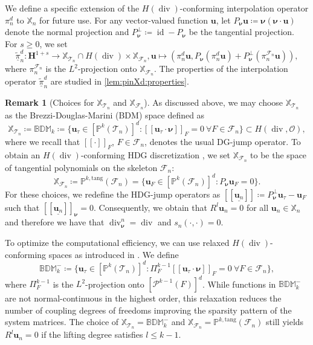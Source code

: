 \documentclass{m2an}
\newcommand{\dom}{\mathcal{O}} %
\newcommand{\nv}{\boldsymbol{\nu}}
\renewcommand{\u}{\mathbf{u}}
\renewcommand{\div}{\operatorname{div}}
\DeclareMathOperator{\Id}{\mathrm{id}}%
\newcommand{\calT}{\mathcal{T}}
\newcommand{\X}{\mathbb{X}}
\newcommand{\Xn}{\mathbb{X}_n}
\newcommand{\XT}{\X_{\mathcal{T}_n}}
\newcommand{\XF}{\X_{\mathcal{F}_n}}
\newcommand{\bH}{{\mathbf H}}
\newcommand{\jump}[1]{[\![ #1 ]\!]}
\newcommand{\hdgjump}[1]{[\![\underline{#1} ]\!]}
\newcommand{\Tn}{\calT_n}
\newcommand{\ddiv}{\div_{\nv}^n}
\newcommand{\Fn}{\mathcal{F}_n}
\newcommand{\pinXd}{\underline{\tilde{\pi}}_n^d}
\theoremstyle{plain}
\theoremstyle{definition}
\newtheorem{remark}[theorem]{Remark}
\begin{document}
We define a specific extension of the $H(\div)$-conforming interpolation operator $\pi_n^d$ to $\Xn$ for future use. For any vector-valued function $\u$, let $P_{\nv} \u \coloneqq \nv (\nv \cdot \u)$ denote the normal projection and $P_{\nv}^{\perp} \coloneqq \Id - P_{\nv}$ be the tangential projection. For $s \ge 0$, we set
\begin{equation}\label{eq:def:pinXd}
   \pinXd : \bH^{1+s} \to \XT \cap H(\div) \times \XF, \u \mapsto (\pi_n^d \u, P_{\nv}(\pi_n^d \u) + P_{\nv}^{\perp}(\pi_n^{\Fn}\u)),
\end{equation}
where $\pi_n^{\Fn}$ is the $L^2$-projection onto $\XF$. The properties of the interpolation operator $\pinXd$ are studied in \cref{lem:pinXd:properties}. 



\begin{remark}[Choices for $\XT$ and $\XF$]\label{rem:HdivHDG}
   As discussed above, we may choose $\XT$ as the Brezzi-Douglas-Marini (BDM) space \cite{BDM87} defined as 
   \begin{equation*}
      \XT \coloneqq \mathbb{BDM}_{k} \coloneqq \{ \u_{\tau} \in [\mathbb{P}^k(\Tn)]^d : \jump{\u_{\tau} \cdot \nv}_{F} = 0 \ \forall F \in \Fn \} \subset H(\div, \dom),
   \end{equation*}
   where we recall that $\jump{\cdot}_{F}$, $F \in \Fn$, denotes the usual DG-jump operator. To obtain an $H(\div)$-conforming HDG discretization \cite{LS16}, we set $\XF$ to be the space of tangential polynomials on the skeleton $\Fn$:
   \begin{equation*}
      \XF \coloneqq \mathbb{P}^{k,\text{tang}}(\Fn) =  \{ \u_F \in [\mathbb{P}^k(\Fn)]^d : P_{\nv} \u_F = 0 \}.  
   \end{equation*}
   For these choices, we redefine the HDG-jump operators as $\hdgjump{\u_n} \coloneqq P_{\nv}^{\perp} \u_{\tau} - \u_F$ such that $\hdgjump{\u_n}_{\nv} = 0$.
   Consequently, we obtain that $R^l \u_n = 0$ for all $\u_n \in \Xn$ and therefore we have that $\ddiv = \div$ and $s_n(\cdot,\cdot) = 0$.

   To optimize the computational efficiency, we can use relaxed $H(\div)$-conforming spaces as introduced in \cite{LLS18,LLS19}. We define 
   \begin{equation*}
      \mathbb{BDM}_{k}^{-} \coloneqq \{ \u_\tau \in [\mathbb{P}^k(\Tn)]^d : \Pi_F^{k-1} \jump{\u_\tau \cdot \nv}_F = 0 \ \forall F \in \Fn \},
   \end{equation*}
   where $\Pi_F^{k-1}$ is the $L^2$-projection onto $[\mathcal{P}^{k-1}(F)]^d$. While functions in $\mathbb{BDM}_{k}^{-}$ are not normal-continuous in the highest order, this relaxation reduces the number of coupling degrees of freedoms improving the sparsity pattern of the system matrices. The choice of $\XT = \mathbb{BDM}_{k}^{-}$ and $\XF = \mathbb{P}^{k,\text{tang}}(\Fn)$ still yields $R^l \u_n = 0$ if the lifting degree satisfies $l \le k-1$. 
\end{remark}
\end{document}
